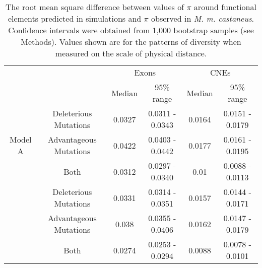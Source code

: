 \begin{table}[H]
\centering
\caption[The root mean square difference between values of $\pi$ around functional elements predicted in simulations and $\pi$ observed in \textit{M. m. castaneus}.]{The root mean square difference between values of $\pi$ around functional elements predicted in simulations and $\pi$ observed in \textit{M. m. castaneus}. Confidence intervals were obtained from 1,000 bootstrap samples (see Methods). Values shown are for the patterns of diversity when measured on the scale of physical distance.}
\begin{adjustbox}{max width=\textwidth}

\begin{tabular}{cccccc}
\toprule
           &                &         \multicolumn{2}{c}{Exons} &         \multicolumn{2}{c}{CNEs}  \\

           &                         &  Median &        95\% range &  Median &        95\% range \\ \midrule
   \multirow{3}{*}{Model A} &   Deleterious Mutations &  0.0327 &  0.0311 - 0.0343 &  0.0164 &  0.0151 - 0.0179 \\
        &  Advantageous Mutations &  0.0422 &  0.0403 - 0.0442 &  0.0177 &  0.0161 - 0.0195 \\
        &                    Both &  0.0312 &  0.0297 - 0.0340 &    0.01 &  0.0088 - 0.0113 \\ \hdashline
   \multirow{3}{*}{Model B} &   Deleterious Mutations &  0.0331 &  0.0314 - 0.0351 &  0.0157 &  0.0144 - 0.0171 \\
        &  Advantageous Mutations &   0.038 &  0.0355 - 0.0406 &  0.0162 &  0.0147 - 0.0179 \\
        &                    Both &  0.0274 &  0.0253 - 0.0294 &  0.0088 &  0.0078 - 0.0101 \\
\bottomrule
\end{tabular}
\end{adjustbox}
\label{tab:RMS}
\end{table}